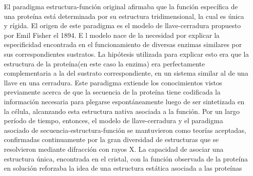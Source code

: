 

El paradigma estructura-función original afirmaba que la función específica de una proteína está determinada por su estructura tridimensional, la cual es única y rígida. 
El origen de este paradigma es el modelo de llave-cerradura propuesto por Emil Fisher el 1894. E
l modelo nace de la necesidad por explicar la especificidad encontrada en el funcionamiento de diversas enzimas similares por sus correspondientes sustratos. 
La hipótesis utilizada para explicar esto era que la estructura de la proteína(en este caso la enzima) era perfectamente complementaria a la del sustrato correspondiente, en un sistema similar al de una llave en una cerradura.
Este paradigma extiende los conocimientos vistos previamente acerca de que la secuencia de la proteína tiene codificada la información necesaria para plegarse espontáneamente luego de ser sintetizada en la célula,
alcanzando esta estructura nativa asociada a la función.
Por un largo período de tiempo, entonces, el modelo de llave-cerradura y el paradigma asociado de secuencia-estructura-función se mantuvieron como teorías aceptadas, confirmadas continuamente por la
gran diversidad de estructuras que se resolvieron mediante difracción con rayos X. 
La capacidad de asociar una estructura única, encontrada en el cristal, con la función observada de la proteína en solución reforzaba la idea de una estructura estática asociada a las proteínas

